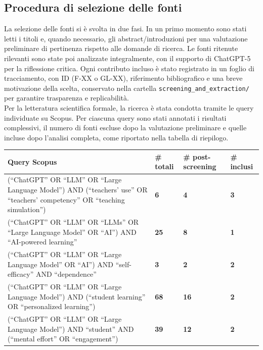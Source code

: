 \documentclass[a4paper,9pt]{article}
\begin{document}
	\subsection{Procedura di selezione delle fonti}
	
	La selezione delle fonti si è svolta in due fasi. In un primo momento sono stati letti i titoli e, quando necessario, gli abstract/introduzioni per una valutazione preliminare di pertinenza rispetto alle domande di ricerca. Le fonti ritenute rilevanti sono state poi analizzate integralmente, con il supporto di ChatGPT-5 per la riflessione critica.
	Ogni contributo incluso è stato registrato in un foglio di tracciamento, con ID (F-XX o GL-XX), riferimento bibliografico e una breve motivazione della scelta, conservato nella cartella \texttt{screening\_and\_extraction/} per garantire trasparenza e replicabilità.\\
	Per la letteratura scientifica formale, la ricerca è stata condotta tramite le query individuate su Scopus. Per ciascuna query sono stati annotati i risultati complessivi, il numero di fonti escluse dopo la valutazione preliminare e quelle incluse dopo l’analisi completa, come riportato nella tabella di riepilogo.\\
	
		\begin{tabular}{|m{4.5cm}|m{2cm}|m{3cm}|m{2cm}|}
			\hline
			\textbf{Query Scopus} & \textbf{\# totali} & \textbf{\# post-screening} & \textbf{\# inclusi} \tabularnewline
			\hline
			(``ChatGPT'' OR ``LLM'' OR ``Large Language Model'') AND (``teachers' use'' OR ``teachers' competency'' OR ``teaching simulation'') & \centering \Large  \textbf{6}  &  \centering \Large \textbf{4}  & \centering \Large \textbf{3}  \tabularnewline
			\hline
			(``ChatGPT'' OR ``LLM'' OR ``LLMs'' OR ``Large Language Model'' OR ``AI'') AND ``AI-powered learning'' & \centering \Large \textbf{25}  & \centering \Large \textbf{8}  & \centering \Large \textbf{1}  \tabularnewline
			\hline
			(``ChatGPT'' OR ``LLM'' OR ``Large Language Model'' OR ``AI'') AND ``self-efficacy'' AND ``dependence'' & \centering \Large \textbf{3}  & \centering \Large \textbf{2}  & \centering \Large \textbf{2} \tabularnewline
			\hline
			(``ChatGPT'' OR ``LLM'' OR ``Large Language Model'') AND (``student learning'' OR ``personalized learning'') & \centering \Large \textbf{68}  & \centering \Large \textbf{16}  & \centering \Large \textbf{2}  \tabularnewline
			\hline
			(``ChatGPT'' OR ``LLM'' OR ``Large Language Model'') AND ``student'' AND (``mental effort'' OR ``engagement'') & \centering \Large \textbf{39} & \centering \Large \textbf{12}  & \centering \Large \textbf{2}  \tabularnewline
			\hline
		\end{tabular}
\end{document}
